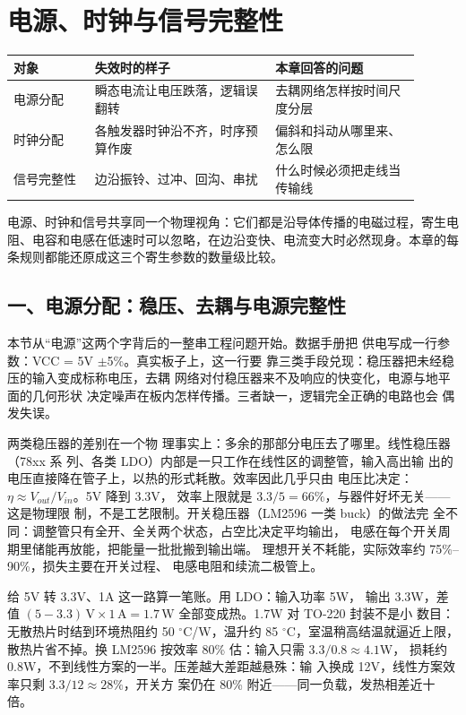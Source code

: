 \chapter{电源、时钟与信号完整性}

\begin{longtable}{L{0.18\linewidth}L{0.4\linewidth}L{0.32\linewidth}}
\toprule
对象 & 失效时的样子 & 本章回答的问题 \\
\midrule
电源分配 & 瞬态电流让电压跌落，逻辑误翻转 & 去耦网络怎样按时间尺度分层 \\
时钟分配 & 各触发器时钟沿不齐，时序预算作废 & 偏斜和抖动从哪里来、怎么限 \\
信号完整性 & 边沿振铃、过冲、回沟、串扰 & 什么时候必须把走线当传输线 \\
\bottomrule
\end{longtable}

\begin{keyidea}
电源、时钟和信号共享同一个物理视角：它们都是沿导体传播的电磁过程，寄生电阻、电容和电感在低速时可以忽略，在边沿变快、电流变大时必然现身。本章的每条规则都能还原成这三个寄生参数的数量级比较。
\end{keyidea}

\section{一、电源分配：稳压、去耦与电源完整性}

本节从“电源”这两个字背后的一整串工程问题开始。数据手册把
供电写成一行参数：VCC = 5V $\pm$5\%。真实板子上，这一行要
靠三类手段兑现：稳压器把未经稳压的输入变成标称电压，去耦
网络对付稳压器来不及响应的快变化，电源与地平面的几何形状
决定噪声在板内怎样传播。三者缺一，逻辑完全正确的电路也会
偶发失误。

两类稳压器的差别在一个物
理事实上：多余的那部分电压去了哪里。线性稳压器（78xx 系
列、各类 LDO）内部是一只工作在线性区的调整管，输入高出输
出的电压直接降在管子上，以热的形式耗散。效率因此几乎只由
电压比决定：$\eta \approx V_{out}/V_{in}$。5V 降到 3.3V，
效率上限就是 $3.3/5 = 66\%$，与器件好坏无关——这是物理限
制，不是工艺限制。开关稳压器（LM2596 一类 buck）的做法完
全不同：调整管只有全开、全关两个状态，占空比决定平均输出，
电感在每个开关周期里储能再放能，把能量一批批搬到输出端。
理想开关不耗能，实际效率约 75\%--90\%，损失主要在开关过程、
电感电阻和续流二极管上。

给 5V 转 3.3V、1A 这一路算一笔账。用 LDO：输入功率 5W，
输出 3.3W，差值 $(5-3.3)\,\mathrm{V} \times 1\,\mathrm{A}
= 1.7\,\mathrm{W}$ 全部变成热。1.7W 对 TO-220 封装不是小
数目：无散热片时结到环境热阻约 50 $^{\circ}$C/W，温升约
85 $^{\circ}$C，室温稍高结温就逼近上限，散热片省不掉。换
LM2596 按效率 80\% 估：输入只需 $3.3/0.8 \approx 4.1$W，
损耗约 0.8W，不到线性方案的一半。压差越大差距越悬殊：输
入换成 12V，线性方案效率只剩 $3.3/12 \approx 28\%$，开关方
案仍在 80\% 附近——同一负载，发热相差近十倍。

